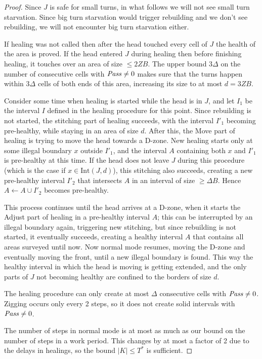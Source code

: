 \documentclass[11pt]{memoir}
\theoremstyle{definition} %
\renewcommand{\le}{\leq}
\renewcommand{\ge}{\geq}
\newcommand{\fld}[1]{\ensuremath{\textit{#1\/}}}
\def\B{B}
\newcommand{\Int}{\mathrm{Int}} %
\newcommand{\Tu}{T}
\newcommand{\Z}{Z} %
\newcommand{\Pass}{\fld{Pass}} %
\begin{document}
\begin{proof}
  Since \( J \) is safe for small turns, in what follows we will not see small turn starvation.
  Since big turn starvation would trigger rebuilding and we don't see rebuilding,
  we will not encounter big turn starvation either.
  
  If healing was not called then after the head touched every cell of \( J \) the
  health of the area is proved.
  If the head entered \( J \) during healing then before finishing healing,
  it touches over an area of size \( \le 2\Z\B \).
  The upper bound \( 3\Delta \) on the number of consecutive cells with \( \Pass\ne 0 \)
  makes sure that the turns happen within \( 3\Delta \) cells of both ends of this area, increasing
  its size to at most \( d = 3\Z\B \).
  
  Consider some time when healing is started while the head is in \( J \),
  and let \( I_{1} \) be the interval \( I \) defined in the healing
  procedure for this point.
  Since rebuilding is not started, the stitching part of healing succeeds, with the interval \( I'_{1} \)
  becoming pre-healthy, while staying in an area of size \( d \).
  After this, the Move part of healing is trying to move the head towards a D-zone.
  New healing starts only at some illegal boundary \( x \) outside \( I'_{1} \),
  and the interval \( A \) containing both \( x \) and \( I'_{1} \) is pre-healthy at this time.
  If the head does not leave \( J \) during this procedure (which is the case if \( x\in\Int(J,d) \)),
  this stitching also succeeds, creating a new pre-healthy interval \( I'_{2} \) that
  intersects \( A \) in an interval of size \( \ge\Delta\B \).
  Hence \( A\gets A\cup I'_{2} \) becomes pre-healthy.

  This process continues until the head arrives at a D-zone, when it starts
  the Adjust part of healing in a pre-healthy interval \( A \);
  this can be interrupted by an illegal boundary again,
  triggering new stitching, but since rebuilding is not started, 
  it eventually succeeds, creating a healthy interval \( A \) that
  contains all areas surveyed until now.
  Now normal mode resumes, moving the D-zone and eventually moving the front,
  until a new illegal boundary is found.
  This way the healthy interval in which the head is moving is getting extended,
  and the only parts of \( J \) not becoming healthy are confined to the borders
  of size \( d \).

  The healing procedure can only create at most \( \Delta \) consecutive cells with
  \( \Pass\ne 0 \).
  Zigging occurs only every 2 steps, so it does not create solid intervals with \( \Pass\ne 0 \).

  The number of steps in normal mode is at most as much as our bound on the number of
  steps in a work period.
  This changes by at most a factor of 2 due to the delays in healings, so the bound \( |K|\le\Tu^{*} \)
  is sufficient.
\end{proof}
\end{document}
